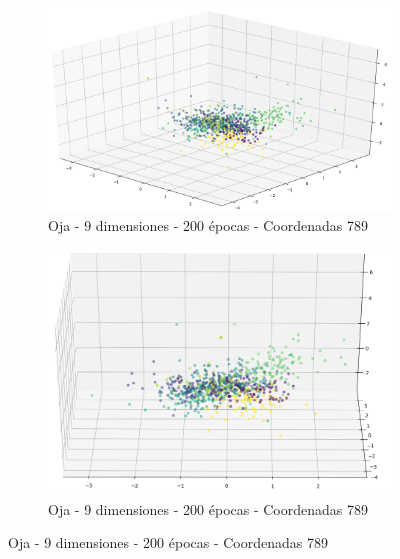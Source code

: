 \begin{figure}[!htbp]
\centering
\begin{subfigure}{.5\textwidth}
  \centering
  \includegraphics[width=1\linewidth, scale=1]{../img/ej1/oja_corrida_200_9/oja_9salida_200ep_testing_dim789.png}
  \caption{Oja - 9 dimensiones - 200 épocas - Coordenadas 789}
  \label{fig:sub1}
\end{subfigure}%
\begin{subfigure}{.5\textwidth}
  \centering
  \includegraphics[width=1\linewidth, scale=1]{../img/ej1/oja_corrida_200_9/oja_9salida_200ep_testing_dim789_2.png}
  \caption{Oja - 9 dimensiones - 200 épocas - Coordenadas 789}
  \label{fig:sub2}
\end{subfigure}
\end{figure}

